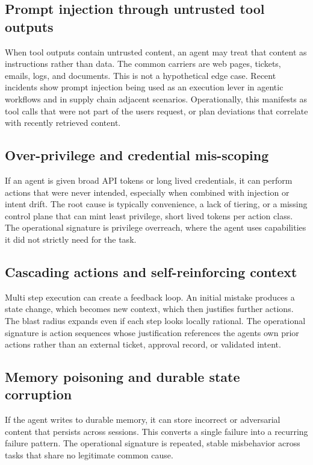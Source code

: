 \documentclass[11pt]{article}
\begin{document}
\subsection{Prompt injection through untrusted tool outputs}
When tool outputs contain untrusted content, an agent may treat that content as instructions rather than data. The common carriers are web pages, tickets, emails, logs, and documents. This is not a hypothetical edge case. Recent incidents show prompt injection being used as an execution lever in agentic workflows and in supply chain adjacent scenarios. Operationally, this manifests as tool calls that were not part of the user\textquotesingle s request, or plan deviations that correlate with recently retrieved content.

\subsection{Over-privilege and credential mis-scoping}
If an agent is given broad API tokens or long lived credentials, it can perform actions that were never intended, especially when combined with injection or intent drift. The root cause is typically convenience, a lack of tiering, or a missing control plane that can mint least privilege, short lived tokens per action class. The operational signature is privilege overreach, where the agent uses capabilities it did not strictly need for the task.

\subsection{Cascading actions and self-reinforcing context}
Multi step execution can create a feedback loop. An initial mistake produces a state change, which becomes new context, which then justifies further actions. The blast radius expands even if each step looks locally rational. The operational signature is action sequences whose justification references the agent\textquotesingle s own prior actions rather than an external ticket, approval record, or validated intent.

\subsection{Memory poisoning and durable state corruption}
If the agent writes to durable memory, it can store incorrect or adversarial content that persists across sessions. This converts a single failure into a recurring failure pattern. The operational signature is repeated, stable misbehavior across tasks that share no legitimate common cause.
\end{document}
